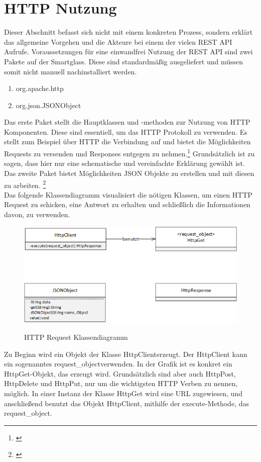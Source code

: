\section{HTTP Nutzung}
\label{sec:httpnutzung}
Dieser Abschnitt befasst sich nicht mit einem konkreten Prozess, sondern erklärt das allgemeine Vorgehen und die Akteure bei einem der vielen REST API Aufrufe. Voraussetzungen für eine einwandfrei Nutzung der REST API sind zwei Pakete auf der Smartglass. Diese sind standardmäßig ausgeliefert und müssen somit nicht manuell nachinstalliert werden.
\begin{enumerate}
	\item org.apache.http
	\item org.json.JSONObject
\end{enumerate}
Das erste Paket stellt die Hauptklassen und -methoden zur Nutzung von HTTP Komponenten. Diese sind essentiell, um das HTTP Protokoll zu verwenden. Es stellt zum Beispiel über HTTP die Verbindung auf und bietet die Möglichkeiten Requests zu versenden und Responses entgegen zu nehmen.\footnote{\citep{http}} Grundsätzlich ist zu sagen, dass hier nur eine schematische und vereinfachte Erklärung gewählt ist. 
\\
Das zweite Paket bietet Möglichkeiten JSON Objekte zu erstellen und mit diesen zu arbeiten. \footnote{\citep{json}}
\\
Das folgende Klassendiagramm visualisiert die nötigen Klassen, um einen HTTP Request zu schicken, eine Antwort zu erhalten und schließlich die Informationen davon, zu verwenden.
\begin{figure}[H]
	\centering
	{\includegraphics[scale=0.7]{Bilder/Abbildungen/http_request_klassendiagramm.png}}
	\caption{HTTP Request Klassendiagramm}
	\label{fig:sequenz_warenannnahme}
\end{figure}
Zu Beginn wird ein Objekt der Klasse \glqq HttpClient\grqq erzeugt. Der HttpClient kann ein sogenanntes \glqq request\_object\grqq verwenden. In der Grafik ist es konkret ein \glqq HttpGet\grqq -Objekt, das erzeugt wird. Grundsätzlich sind aber auch HttpPost, HttpDelete und HttpPut, nur um die wichtigsten HTTP Verben zu nennen, möglich. In einer Instanz der Klasse HttpGet wird eine URL zugewiesen, und anschließend benutzt das Objekt HttpClient, mithilfe der \glqq execute\grqq -Methode, das request\_object.
